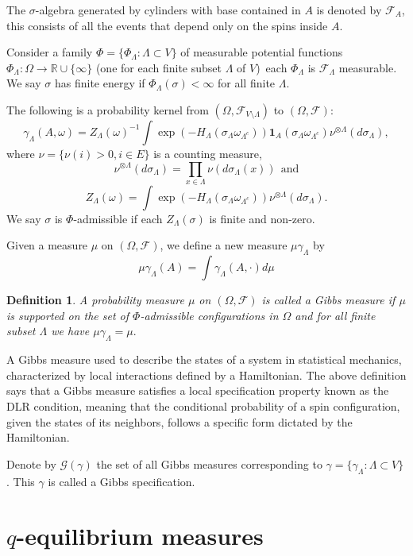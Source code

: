 \documentclass[11pt,reqno]{amsart}
\newtheorem{defn}{Definition}
\numberwithin{equation}{section} \setcounter{tocdepth}{1}
\begin{document}
The $\sigma$-algebra generated by cylinders with base contained in $A$ is denoted by 
$\mathcal F_A$, this consists of all the events that depend only on the spins inside $A$.

Consider a family $\Phi=\{\Phi_\Lambda: \Lambda\subset V \}$ of measurable potential 
functions $\Phi_\Lambda:\Omega\to \mathbb R\cup\{\infty\}$
(one for each finite subset $\Lambda$ of $V$)\ each $\Phi_\Lambda$ is $\mathcal F_\Lambda$
measurable. 
We say $\sigma$ has finite energy if $ \Phi_\Lambda(\sigma) < \infty$ for all finite $\Lambda$.

The following is a probability kernel from $(\Omega, \mathcal F_{V\setminus\Lambda})$ to $(\Omega, \mathcal F)$:
$$\gamma_\Lambda(A,\omega)=Z_\Lambda(\omega)^{-1}\int\exp(-H_\Lambda(\sigma_\Lambda\omega_{\Lambda^c}))
\mathbf{1}_A(\sigma_\Lambda\omega_{\Lambda^c})\nu^{\otimes\Lambda}(d\sigma_\Lambda),$$
where $\nu=\{\nu(i)>0, i\in E\}$ is a counting measure,
$$\nu^{\otimes\Lambda}(d\sigma_\Lambda)=\prod_{x\in \Lambda}\nu(d\sigma_\Lambda(x)) \ \ \mbox{and}$$
$$Z_\Lambda(\omega)=\int\exp(-H_\Lambda(\sigma_\Lambda\omega_{\Lambda^c}))\nu^{\otimes\Lambda}(d\sigma_\Lambda).$$
 We say $\sigma$ is $\Phi$-admissible
if each $Z_\Lambda(\sigma)$ is finite and non-zero.

Given a measure $\mu$ on $(\Omega, \mathcal F)$, we define a new
measure $\mu\gamma_\Lambda$ by
$$\mu\gamma_\Lambda(A)=\int\gamma_\Lambda(A, \cdot)d\mu$$

\begin{defn} A probability measure $\mu$ on $(\Omega, \mathcal F)$ is called a Gibbs measure if $\mu$ is supported on the set of $\Phi$-admissible configurations in $\Omega$ and for all finite subset $\Lambda$ we have
	$\mu \gamma_\Lambda=\mu.$
\end{defn}

A Gibbs measure used to describe the states of a system in statistical mechanics, characterized by local interactions defined by a Hamiltonian. The above definition says that a Gibbs measure satisfies a local specification property known as the DLR condition, meaning that the conditional probability of a spin configuration, given the states of its neighbors, follows a specific form dictated by the Hamiltonian.

Denote by $\mathcal G(\gamma)$ the set of all Gibbs measures corresponding to $\gamma=\{\gamma_\Lambda: \Lambda\subset V\}$. This $\gamma$ is called a Gibbs specification.

\section{$q$-equilibrium measures}
\end{document}
